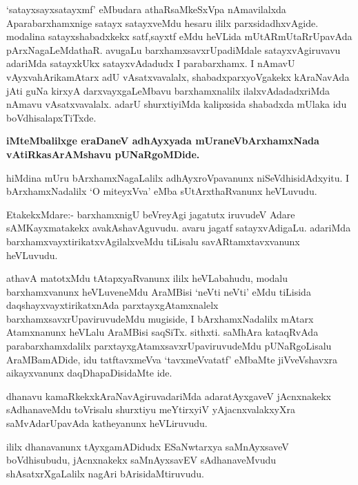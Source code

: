 \begin{artha}
`satayxsayxsatayxmf' eMbudara athaRsaMkeSxVpa nAmavilalxda Aparabarxhamxnige
  satayx satayxveMdu hesaru ililx parxsidadhxvAgide. modalina
  satayxshabadxkekx satf,sayxtf eMdu heVLida mUtARmUtaRrUpavAda
  pArxNagaLeMdathaR. avugaLu barxhamxsavxrUpadiMdale satayxvAgiruvavu
  adariMda satayxkUkx satayxvAdadudx I parabarxhamx. I nAmavU
  vAyxvahArikamAtarx adU vAsatxvavalalx, shabadxparxyoVgakekx
  kAraNavAda jAti guNa kirxyA darxvayxgaLeMbavu barxhamxnalilx
  ilalxvAdadadxriMda nAmavu vAsatxvavalalx. adarU shurxtiyiMda
  kalipxsida shabadxda mUlaka idu boVdhisalapxTiTxde.
\end{artha}

\begin{center}
\textbf{iMteMbalilxge eraDaneV adhAyxyada mUraneVbArxhamxNada vAtiRkasArAMshavu pUNaRgoMDide.}
\end{center}

\newpage
\centerline{}

\centerline{}

\begin{artha}
hiMdina mUru bArxhamxNagaLalilx adhAyxroVpavanunx
niSeVdhisidAdxyitu.  I bArxhamxNadalilx `O miteyxVva' eMba sUtArxthaRvanunx heVLuvudu. 

EtakekxMdare:- barxhamxnigU beVreyAgi jagatutx iruvudeV Adare
sAMKayxmatakekx avakAshavAguvudu. avaru jagatf satayxvAdigaLu. adariMda
barxhamxvayxtirikatxvAgilalxveMdu tiLisalu savARtamxtavxvanunx heVLuvudu.
\end{artha}

\begin{artha}
athavA matotxMdu tAtapxyaRvanunx ililx heVLabahudu, modalu
barxhamxvanunx heVLuveneMdu AraMBisi `neVti neVti' eMdu tiLisida
daqshayxvayxtirikatxnAda parxtayxgAtamxnalelx
barxhamxsavxrUpaviruvudeMdu mugiside, I bArxhamxNadalilx mAtarx
Atamxnanunx heVLalu AraMBisi saqSiTx. sithxti. saMhAra
kataqRvAda parabarxhamxdalilx parxtayxgAtamxsavxrUpaviruvudeMdu
pUNaRgoLisalu AraMBamADide, idu tatftavxmeVva `tavxmeVvatatf' eMbaMte
jiVveVshavxra aikayxvanunx daqDhapaDisidaMte ide.
\end{artha}

\centerline{}

\begin{artha}
dhanavu kamaRkekxkAraNavAgiruvadariMda adaratAyxgaveV jAcnxnakekx
sAdhanaveMdu toVrisalu shurxtiyu meYtirxyiV yAjacnxvalakxyXra
saMvAdarUpavAda katheyanunx heVLiruvudu.

ililx dhanavanunx tAyxgamADidudx ESaNwtarxya saMnAyxsaveV
boVdhisubudu, jAcnxnakekx saMnAyxsavEV sAdhanaveMvudu
shAsatxrXgaLalilx nagAri bArisidaMtiruvudu.
\end{artha}

